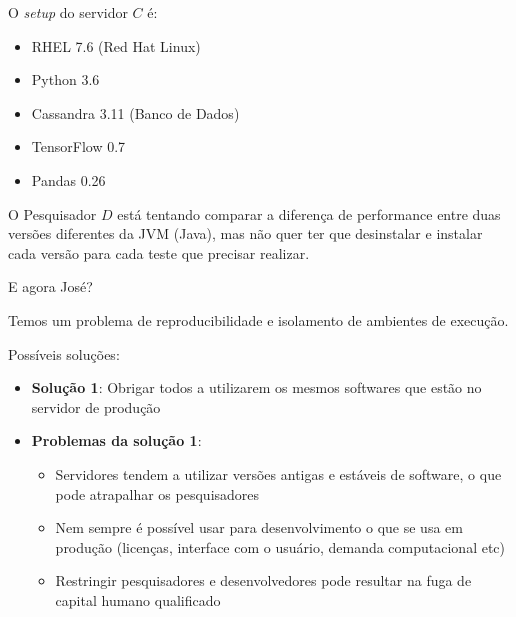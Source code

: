 \documentclass[
  ignorenonframetext,
]{beamer}
\providecommand{\tightlist}{%
  \setlength{\itemsep}{0pt}\setlength{\parskip}{0pt}}
\begin{document}
\begin{frame}

O \emph{setup} do servidor \(C\) é:

\begin{itemize}
\tightlist
\item
  RHEL 7.6 (Red Hat Linux)
\item
  Python 3.6
\item
  Cassandra 3.11 (Banco de Dados)
\item
  TensorFlow 0.7
\item
  Pandas 0.26
\end{itemize}

\end{frame}

\begin{frame}

O Pesquisador \(D\) está tentando comparar a diferença de performance
entre duas versões diferentes da JVM (Java), mas não quer ter que
desinstalar e instalar cada versão para cada teste que precisar
realizar.

\end{frame}

\begin{frame}

E agora José?

\end{frame}

\begin{frame}

Temos um problema de reproducibilidade e isolamento de ambientes de
execução.

\end{frame}

\begin{frame}{Possíveis soluções:}
\protect\hypertarget{possiveis-solucoes}{}

\begin{itemize}
\tightlist
\item
  \textbf{Solução 1}: Obrigar todos a utilizarem os mesmos softwares que
  estão no servidor de produção
\item
  \textbf{Problemas da solução 1}:

  \begin{itemize}
  \tightlist
  \item
    Servidores tendem a utilizar versões antigas e estáveis de software,
    o que pode atrapalhar os pesquisadores
  \item
    Nem sempre é possível usar para desenvolvimento o que se usa em
    produção (licenças, interface com o usuário, demanda computacional
    etc)
  \item
    Restringir pesquisadores e desenvolvedores pode resultar na fuga de
    capital humano qualificado
  \end{itemize}
\end{itemize}

\end{frame}
\end{document}
